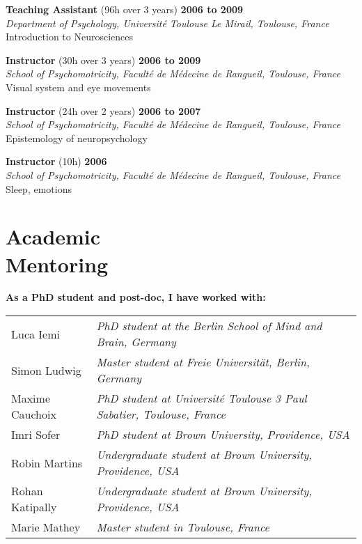 \documentclass[margin,line]{resume}
\begin{document}
\begin{resume}
	\textbf{Teaching Assistant} (96h over 3 years) \hfill \textbf{2006 to 2009}\\
	\textsl{Department of Psychology, Université Toulouse Le Mirail, Toulouse, France}\\
	Introduction to Neurosciences

	\textbf{Instructor} (30h over 3 years) \hfill \textbf{2006 to 2009}\\
	\textsl{School of Psychomotricity, Faculté de Médecine de Rangueil, Toulouse, France}\\
	Visual system and eye movements

	\textbf{Instructor} (24h over 2 years) \hfill \textbf{2006 to 2007}\\
	\textsl{School of Psychomotricity, Faculté de Médecine de Rangueil, Toulouse, France}\\
	Epistemology of neuropsychology



	\textbf{Instructor} (10h) \hfill \textbf{2006}\\
	\textsl{School of Psychomotricity, Faculté de Médecine de Rangueil, Toulouse, France}\\
	Sleep, emotions


	\vspace{3mm}
    \section{\mysidestyle Academic\\Mentoring}
	
	\textbf{As a PhD student and post-doc, I have worked with:}\\
	\begin{tabular}{@{}ll} %
	Luca Iemi       & \textsl{PhD student at the Berlin School of Mind and Brain, Germany}\\
	Simon Ludwig    & \textsl{Master student at Freie Universität, Berlin, Germany}\\
	Maxime Cauchoix & \textsl{PhD student at Université Toulouse 3 Paul Sabatier, Toulouse, France}\\
	Imri Sofer      & \textsl{PhD student at Brown University, Providence, USA}\\
	Robin Martins   & \textsl{Undergraduate student at Brown University, Providence, USA} \\
	Rohan Katipally & \textsl{Undergraduate student at Brown University, Providence, USA} \\
	Marie Mathey    & \textsl{Master student in Toulouse, France}
	\end{tabular}
	



\end{resume}
\end{document}
